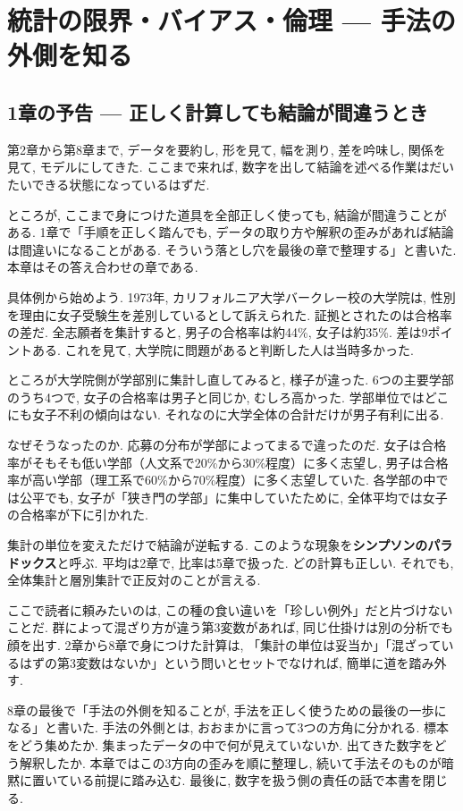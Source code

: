 ﻿\section{統計の限界・バイアス・倫理 — 手法の外側を知る}

\subsection{1章の予告 — 正しく計算しても結論が間違うとき}

第2章から第8章まで, データを要約し, 形を見て, 幅を測り, 差を吟味し, 関係を見て, モデルにしてきた.
ここまで来れば, 数字を出して結論を述べる作業はだいたいできる状態になっているはずだ.

ところが, ここまで身につけた道具を全部正しく使っても, 結論が間違うことがある.
1章で「手順を正しく踏んでも, データの取り方や解釈の歪みがあれば結論は間違いになることがある. そういう落とし穴を最後の章で整理する」と書いた. 本章はその答え合わせの章である.

具体例から始めよう.
1973年, カリフォルニア大学バークレー校の大学院は, 性別を理由に女子受験生を差別しているとして訴えられた.
証拠とされたのは合格率の差だ. 全志願者を集計すると, 男子の合格率は約44\%, 女子は約35\%. 差は9ポイントある.
これを見て, 大学院に問題があると判断した人は当時多かった.

ところが大学院側が学部別に集計し直してみると, 様子が違った.
6つの主要学部のうち4つで, 女子の合格率は男子と同じか, むしろ高かった.
学部単位ではどこにも女子不利の傾向はない. それなのに大学全体の合計だけが男子有利に出る.

なぜそうなったのか.
応募の分布が学部によってまるで違ったのだ.
女子は合格率がそもそも低い学部（人文系で20\%から30\%程度）に多く志望し, 男子は合格率が高い学部（理工系で60\%から70\%程度）に多く志望していた.
各学部の中では公平でも, 女子が「狭き門の学部」に集中していたために, 全体平均では女子の合格率が下に引かれた.

集計の単位を変えただけで結論が逆転する. このような現象を\textbf{シンプソンのパラドックス}と呼ぶ.
平均は2章で, 比率は5章で扱った. どの計算も正しい.
それでも, 全体集計と層別集計で正反対のことが言える.

ここで読者に頼みたいのは, この種の食い違いを「珍しい例外」だと片づけないことだ.
群によって混ざり方が違う第3変数があれば, 同じ仕掛けは別の分析でも顔を出す.
2章から8章で身につけた計算は, 「集計の単位は妥当か」「混ざっているはずの第3変数はないか」という問いとセットでなければ, 簡単に道を踏み外す.

8章の最後で「手法の外側を知ることが, 手法を正しく使うための最後の一歩になる」と書いた.
手法の外側とは, おおまかに言って3つの方角に分かれる.
標本をどう集めたか. 集まったデータの中で何が見えていないか. 出てきた数字をどう解釈したか.
本章ではこの3方向の歪みを順に整理し, 続いて手法そのものが暗黙に置いている前提に踏み込む.
最後に, 数字を扱う側の責任の話で本書を閉じる.

